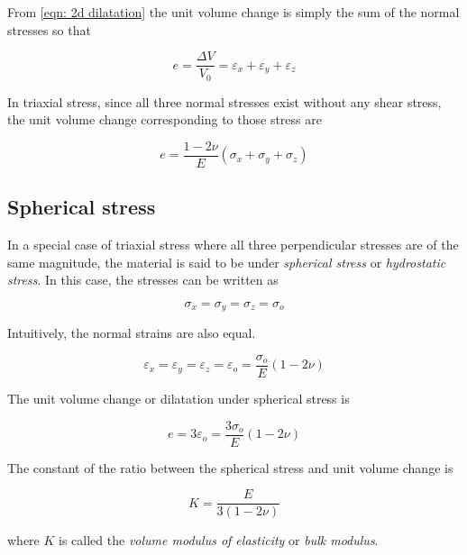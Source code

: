 \documentclass[
10pt,
a4paper,
openany,
svgnames,
]{kaobook} %
\begin{document}
From \cref{eqn: 2d dilatation} the unit volume change is simply the sum of the normal stresses so that

\begin{equation}
  e = \frac{\Delta V}{V_0} = \varepsilon_x + \varepsilon_y + \varepsilon _z
\end{equation}

In triaxial stress, since all three normal stresses exist without any shear stress, the unit volume change corresponding to those stress are

\begin{equation}
  e = \frac{1 - 2\nu}{E}(\sigma_x + \sigma_y + \sigma_z)
\end{equation}

\subsection{Spherical stress}

In a special case of triaxial stress where all three perpendicular stresses are of the same magnitude, the material is said to be under \emph{spherical stress} or \emph{hydrostatic stress}. In this case, the stresses can be written as

\[\sigma_x = \sigma_y = \sigma_z = \sigma_o\]

Intuitively, the normal strains are also equal.

\[\varepsilon _x = \varepsilon _y = \varepsilon _z = \varepsilon _o = \frac{\sigma _o}{E}(1 - 2\nu )\]

The unit volume change or dilatation under spherical stress is

\begin{equation}
  e = 3\varepsilon_o = \frac{3\sigma_o}{E}(1 - 2\nu )
\end{equation}

The constant of the ratio between the spherical stress and unit volume change is

\begin{equation}
  K = \frac{E}{3(1 - 2\nu )}
\end{equation}

where $K$ is called the \emph{volume modulus of elasticity} or \emph{bulk modulus}.
\end{document}
